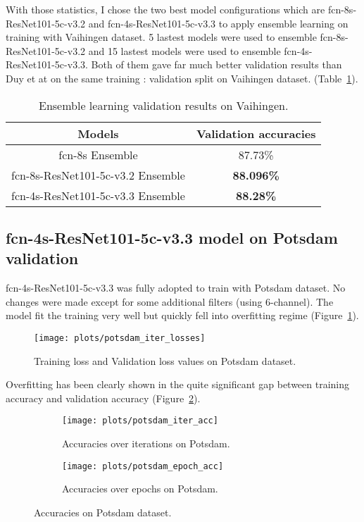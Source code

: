 With those statistics, I chose the two best model configurations which are
\acrshort{fcn}-8s-ResNet101-5c-v3.2 and \acrshort{fcn}-4s-ResNet101-5c-v3.3
to apply ensemble learning on training with Vaihingen dataset.
5 lastest models were used to ensemble \acrshort{fcn}-8s-ResNet101-5c-v3.2
and 15 lastest models were used to ensemble \acrshort{fcn}-4s-ResNet101-5c-v3.3.
Both of them gave far much better validation results than Duy et at
\cite{duytv-2017} on the same training : validation split on Vaihingen dataset.
(Table~\ref{tab:minhnd_vs_duytv_vaihingen}).
\begin{table}[h!]
    \centering
    \begin{tabular}{ | c | c | }
        \hline
        Models & Validation accuracies \\
        \hline
        \acrshort{fcn}-8s Ensemble & 87.73\% \\
        \acrshort{fcn}-8s-ResNet101-5c-v3.2 Ensemble & \textbf{88.096\%} \\
        \acrshort{fcn}-4s-ResNet101-5c-v3.3 Ensemble & \textbf{88.28\%} \\
        \hline
    \end{tabular}
    \caption{Ensemble learning validation results on Vaihingen.}
    \label{tab:minhnd_vs_duytv_vaihingen}
\end{table}

\subsection{\acrshort{fcn}-4s-ResNet101-5c-v3.3 model on Potsdam validation}
\acrshort{fcn}-4s-ResNet101-5c-v3.3 was fully adopted to train with Potsdam
dataset. No changes were made except for some additional filters
(using 6-channel). The model fit the training very well but quickly fell into
overfitting regime (Figure~\ref{fig:potsdam_iter_losses}).
\begin{figure}[h!]
    \centering
    \texttt{[image: plots/potsdam\_iter\_losses]}
    \caption{Training loss and Validation loss values on Potsdam dataset.}
    \label{fig:potsdam_iter_losses}
\end{figure}

Overfitting has been clearly shown in the quite significant gap between
training accuracy and validation accuracy
(Figure~\ref{fig:potsdam_accs}).
\begin{figure}[h!]
    \centering
    \begin{subfigure}[b]{0.495\linewidth}
        \centering
        \texttt{[image: plots/potsdam\_iter\_acc]}
        \caption{Accuracies over iterations on Potsdam.}
    \end{subfigure}
    \begin{subfigure}[b]{0.495\linewidth}
        \centering
        \texttt{[image: plots/potsdam\_epoch\_acc]}
        \caption{Accuracies over epochs on Potsdam.}
    \end{subfigure}
    \caption{Accuracies on Potsdam dataset.}
    \label{fig:potsdam_accs}
\end{figure}


